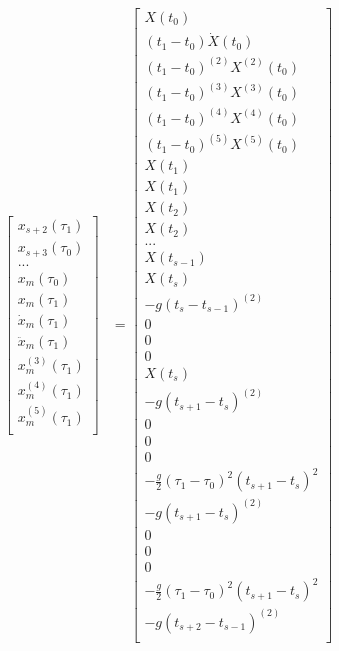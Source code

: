 \documentclass[11pt]{article}
\begin{document}
\begin{align}
\begin{bmatrix}
x_{s+2} (\tau_1) \\
x_{s+3} (\tau_0) \\
... \\
x_{m} (\tau_0) \\
x_{m} (\tau_1) \\
\dot{x}_{m} (\tau_1) \\
\ddot{x}_{m} (\tau_1) \\
x^{(3)}_{m} (\tau_1) \\
x^{(4)}_{m} (\tau_1) \\
x^{(5)}_{m} (\tau_1) \\
 \end{bmatrix}
 &= 
 \begin{bmatrix}
  X (t_0) \\
  (t_1-t_0) \dot{X} (t_0) \\
  (t_1-t_0)^{(2)}  X^{(2)} (t_0) \\
    (t_1-t_0)^{(3)}  X^{(3)} (t_0) \\
      (t_1-t_0)^{(4)}  X^{(4)} (t_0) \\
  (t_1-t_0)^{(5)}  X^{(5)} (t_0) \\
    X (t_1) \\
     X (t_1) \\
     X (t_2) \\
X (t_2) \\
  ... \\
  X(t_{s-1}) \\
       X (t_s) \\
 -g (t_s-t_{s-1})^{(2)}  \\
 0 \\
 0 \\
 0 \\
         X (t_{s}) \\
 -g (t_{s+1}-t_{s})^{(2)}  \\
 0 \\
 0 \\
 0 \\
  -\frac{g}{2} (\tau_1-\tau_0)^2 (t_{s+1}-t_s)^2 \\        %
 -g (t_{s+1}-t_{s})^{(2)}  \\
 0 \\
 0 \\
 0 \\
  -\frac{g}{2} (\tau_1-\tau_0)^2 (t_{s+1}-t_s)^2 \\  %
 -g (t_{s+2}-t_{s-1})^{(2)}  \\

\end{bmatrix}
\end{align}
\end{document}
